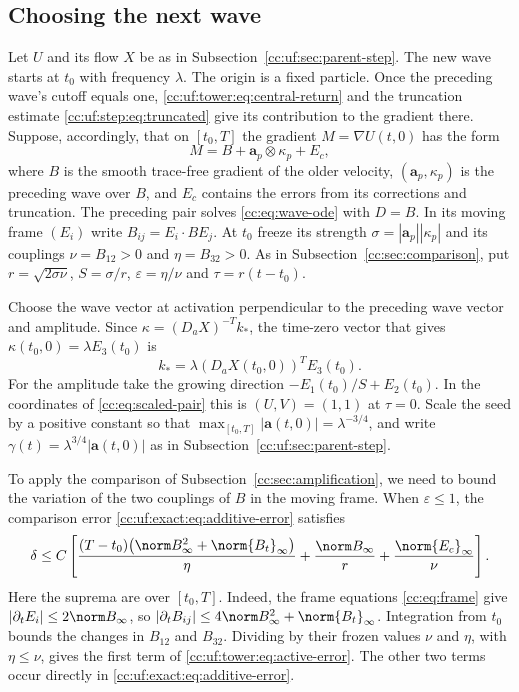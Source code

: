 \subsection{Choosing the next wave}\label{cc:uf:sec:later-wave}
Let $U$ and its flow $X$ be as in Subsection~\ref{cc:uf:sec:parent-step}.
The new wave starts at $t_0$ with frequency $\lambda$. The origin is a
fixed particle. Once the preceding wave's cutoff
equals one, \eqref{cc:uf:tower:eq:central-return} and the truncation
estimate \eqref{cc:uf:step:eq:truncated} give its contribution to the
gradient there. Suppose, accordingly, that on $[t_0,T]$ the gradient
$M=\nabla U(t,0)$ has the form
\begin{equation}\label{cc:uf:tower:eq:split}
 M=B+\mathbf a_p\otimes\kappa_p+E_c ,
\end{equation}
where $B$ is the smooth trace-free gradient of the older velocity, $(\mathbf a_p,\kappa_p)$ is
the preceding wave over $B$, and $E_c$ contains the errors from its
corrections and truncation. The preceding pair solves
\eqref{cc:eq:wave-ode} with $D=B$. In its moving frame $(E_i)$ write
$B_{ij}=E_i\cdot BE_j$. At $t_0$ freeze its strength
$\sigma=|\mathbf a_p||\kappa_p|$ and its couplings $\nu=B_{12}>0$ and
$\eta=B_{32}>0$. As in Subsection~\ref{cc:sec:comparison}, put
$r=\sqrt{2\sigma\nu}$, $S=\sigma/r$, $\varepsilon=\eta/\nu$ and
$\tau=r(t-t_0)$.

Choose the wave vector at activation perpendicular to the preceding
wave vector and amplitude. Since $\kappa=(D_aX)^{-T}k_*$, the
time-zero vector that gives $\kappa(t_0,0)=\lambda E_3(t_0)$ is
\[
 k_*=\lambda (D_aX(t_0,0))^TE_3(t_0).
\]
For the amplitude take the growing direction
$-E_1(t_0)/S+E_2(t_0)$. In the coordinates of \eqref{cc:eq:scaled-pair}
this is $(U,V)=(1,1)$ at $\tau=0$. Scale the seed by a positive
constant so that $\max_{[t_0,T]}|\mathbf a(t,0)|=\lambda^{-3/4}$, and
write $\gamma(t)=\lambda^{3/4}|\mathbf a(t,0)|$ as in
Subsection~\ref{cc:uf:sec:parent-step}.

To apply the comparison of Subsection~\ref{cc:sec:amplification}, we need
to bound the variation of the two couplings of $B$ in the moving frame.
When $\varepsilon\le1$, the comparison error
\eqref{cc:uf:exact:eq:additive-error} satisfies
\begin{equation}\label{cc:uf:tower:eq:active-error}
 \delta\le C\left[
 \frac{(T-t_0)\bigl(\norm B_\infty^2+\norm{B_t}_\infty\bigr)}{\eta}
 +\frac{\norm B_\infty}{r}+\frac{\norm{E_c}_\infty}{\nu}\right].
\end{equation}
Here the suprema are over $[t_0,T]$. Indeed, the frame equations
\eqref{cc:eq:frame} give $|\partial_t E_i|\le2\norm B_\infty$, so
$|\partial_t B_{ij}|\le4\norm B_\infty^2+\norm{B_t}_\infty$.
Integration from $t_0$ bounds the changes in $B_{12}$ and $B_{32}$.
Dividing by their frozen values $\nu$ and $\eta$, with $\eta\le\nu$,
gives the first term of \eqref{cc:uf:tower:eq:active-error}. The other
two terms occur directly in \eqref{cc:uf:exact:eq:additive-error}.

